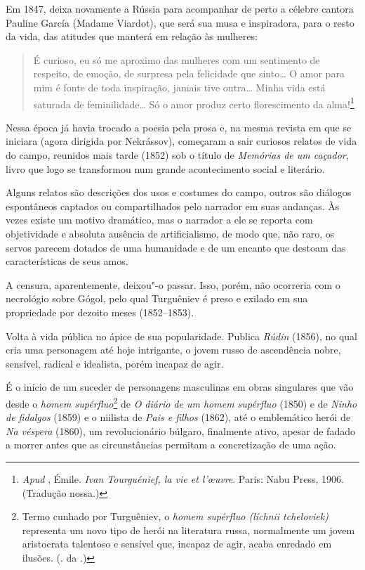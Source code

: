 Em 1847, deixa novamente a Rússia para acompanhar de perto a célebre
cantora Pauline García (Madame Viardot), que será sua musa e inspiradora, para o
resto da vida, das atitudes que manterá em relação às mulheres:

\begin{quotation}
É curioso, eu só me aproximo das mulheres com um sentimento de
respeito, de emoção, de surpresa pela felicidade que sinto\ldots{} O amor para
mim é fonte de toda inspiração, jamais tive outra\ldots{} Minha vida está
saturada de feminilidade\ldots{} Só o amor produz certo florescimento da
alma!\footnote{\emph{Apud} , Émile. \emph{Ivan Tourguénief, la vie et l'œuvre}.
Paris: Nabu Press, 1906. (Tradução nossa.)}
\end{quotation}

Nessa época já havia trocado a poesia pela prosa e, na mesma revista
em que se iniciara (agora dirigida por Nekrássov), começaram a sair curiosos relatos de vida do
campo, reunidos mais tarde (1852) sob o título de \emph{Memórias
de um caçador}, livro que logo se transformou num grande acontecimento social
e literário.

Alguns relatos são descrições dos usos e costumes do campo, outros são diálogos
espontâneos captados ou compartilhados pelo narrador em suas andanças.
Às vezes existe um motivo dramático, mas o narrador a ele se
reporta com objetividade e absoluta ausência de artificialismo, de modo
que, não raro, os servos parecem dotados de uma humanidade e de um encanto
que destoam das características de seus amos.

A censura, aparentemente, deixou"-o passar. Isso, porém, não ocorreria com o necrológio
sobre Gógol, pelo qual Turguêniev é preso e exilado em sua propriedade
por dezoito meses (1852--1853).

Volta à vida pública no ápice de sua popularidade. Publica \emph{Rúdin} (1856), no qual cria uma personagem até hoje
intrigante, o jovem russo de ascendência nobre, sensível, radical e
idealista, porém incapaz de agir.

É o início de um suceder de personagens masculinas em obras
singulares que vão desde o \emph{homem supérfluo}\footnote{Termo cunhado por Turguêniev, o \emph{homem supérfluo
(líchnii tcheloviek)} representa um novo tipo de herói na
literatura russa, normalmente um jovem aristocrata talentoso e
sensível que, incapaz de agir, acaba enredado em ilusões.
(. da .)} de \emph{O diário de um
homem supérfluo} (1850) e de \emph{Ninho de fidalgos} (1859) e o niilista de
\emph{Pais e filhos} (1862), até o emblemático herói de \emph{Na véspera}
(1860), um revolucionário búlgaro, finalmente ativo, apesar de fadado a
morrer antes que as circunstâncias permitam a concretização de uma ação.

